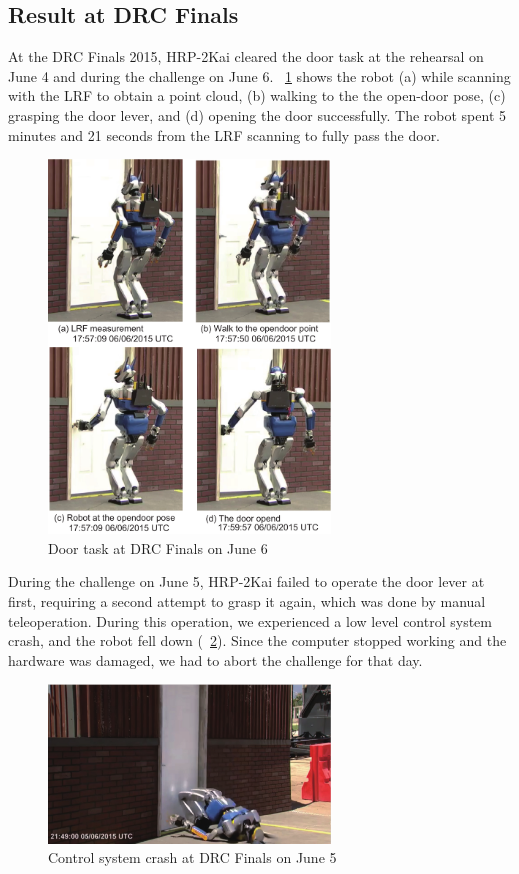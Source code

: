 \subsection{Result at DRC Finals}
%
At the DRC Finals 2015, HRP-2Kai cleared the door task at the rehearsal on June 4 and during
the challenge on June 6.
\figurename~\ref{fig:drc_door_aist_day2} shows the robot (a) while scanning with the LRF to
obtain a point cloud, (b) walking to the the open-door pose, (c) grasping the door lever,
and (d) opening the door successfully.
The robot spent 5 minutes and 21 seconds from the LRF scanning to fully pass the door.
%
\begin{figure}[t]
  \centering
  \includegraphics[width = 7.5cm]{img/drc_door_aist_day2}
  \caption{Door task at DRC Finals on June 6}
  \label{fig:drc_door_aist_day2}
\end{figure}

During the challenge on June 5, HRP-2Kai failed to operate the door lever at first,
requiring a second attempt to grasp it again, which was done by manual teleoperation.
During this operation, we experienced a low level control system crash, and the robot
fell down (\figurename~\ref{fig:drc_door_aist_day1}).
Since the computer stopped working and the hardware was damaged, we had to abort the
challenge for that day. 
%
\begin{figure}[t]
  \centering
  \includegraphics[width = 7.5cm]{img/drc_door_aist_day1}
  \caption{Control system crash at DRC Finals on June 5}
  \label{fig:drc_door_aist_day1}
\end{figure}

